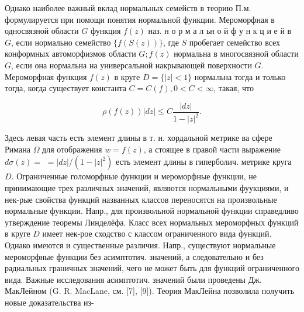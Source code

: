 \documentclass[10pt]{article}
\begin{document}
Однако наиболее важный вклад нормальных семейств в теорию П.м. формулируется при помощи понятия нормальной функции. Мероморфная в односвязной области $G$ функция $f(z)$ наз. н о р м а л ьн $о$ й ф у н к ц и е й в $G$, если нормально семейство $\{f(S(z))\}$, где $S$ пробегает семейство всех конформных автоморфизмов области $G ; f(z)$ нормальна в многосвязной области $G$, если она нормальна на универсальной накрывающей поверхности $G$. Мероморфная функция $f(z)$ в круге $D=\{|z|<1\}$ нормальна тогда и только тогда, когда существует константа $C=C(f), 0<C<\infty$, такая, что



\[

\rho(f(z))|d z| \leqslant C \frac{|d z|}{1-|z|^{2}} .

\]



Здесь левая часть есть элемент длины в т. н. хордальной метрике ва сфере Римана $\Omega$ для отображения $w=f(z)$, а стоящее в правой части выражение $d \sigma(z)=$ $=|d z| /\left(1-|z|^{2}\right)$ есть элемент длины в гиперболич. метрике круга $D$. Ограниченные голоморфные функции и мероморфные функции, не принимающие трех различных значений, являются нормальными фуукциями, и нек-рые свойства функций названных классов переносятся на произвольные нормальные функции. Напр., для произвольной нормальной функции справедливо утверждение теоремы Линделёфа. Класс всех нормальных мероморфных функций в круге $D$ имеет нек-рое сходство с классом ограниченного вида функций. Однако имеются и существенные различия. Напр., существуют нормальные мероморфные функции без асимптотич. значений, а следовательно и без радиальных граничных значений, чего не может быть для функций ограниченного вида. Важные исследования асимптотич. значений были проведены Дж. МакЛейном (G. R. MacLane, см. [7], [9]). Теория МакЛейна позволила получить новые доказательства из-
\end{document}
